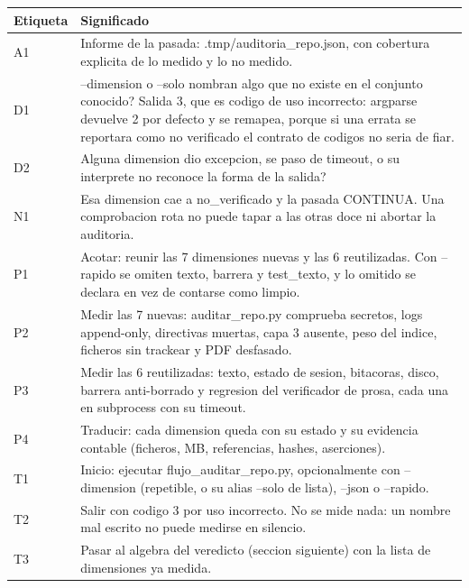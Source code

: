 \documentclass[11pt,a4paper]{article}
\begin{document}
\vspace{6pt}
\begin{tcolorbox}[cajaContenido, title={\faIcon{table}~Leyenda de etiquetas}]
\small
\begin{tabularx}{\linewidth}{@{}>{\centering\arraybackslash}p{1.4cm}X@{}}
\toprule
\textbf{Etiqueta} & \textbf{Significado} \\ \midrule
A1 & Informe de la pasada: .tmp/auditoria\_repo.json, con cobertura explicita de lo medido y lo no medido. \\
D1 & --dimension o --solo nombran algo que no existe en el conjunto conocido? Salida 3, que es codigo de uso incorrecto: argparse devuelve 2 por defecto y se remapea, porque si una errata se reportara como no verificado el contrato de codigos no seria de fiar. \\
D2 & Alguna dimension dio excepcion, se paso de timeout, o su interprete no reconoce la forma de la salida? \\
N1 & Esa dimension cae a no\_verificado y la pasada CONTINUA. Una comprobacion rota no puede tapar a las otras doce ni abortar la auditoria. \\
P1 & Acotar: reunir las 7 dimensiones nuevas y las 6 reutilizadas. Con --rapido se omiten texto, barrera y test\_texto, y lo omitido se declara en vez de contarse como limpio. \\
P2 & Medir las 7 nuevas: auditar\_repo.py comprueba secretos, logs append-only, directivas muertas, capa 3 ausente, peso del indice, ficheros sin trackear y PDF desfasado. \\
P3 & Medir las 6 reutilizadas: texto, estado de sesion, bitacoras, disco, barrera anti-borrado y regresion del verificador de prosa, cada una en subprocess con su timeout. \\
P4 & Traducir: cada dimension queda con su estado y su evidencia contable (ficheros, MB, referencias, hashes, aserciones). \\
T1 & Inicio: ejecutar flujo\_auditar\_repo.py, opcionalmente con --dimension (repetible, o su alias --solo de lista), --json o --rapido. \\
T2 & Salir con codigo 3 por uso incorrecto. No se mide nada: un nombre mal escrito no puede medirse en silencio. \\
T3 & Pasar al algebra del veredicto (seccion siguiente) con la lista de dimensiones ya medida. \\
\bottomrule
\end{tabularx}
\end{tcolorbox}
\end{document}
